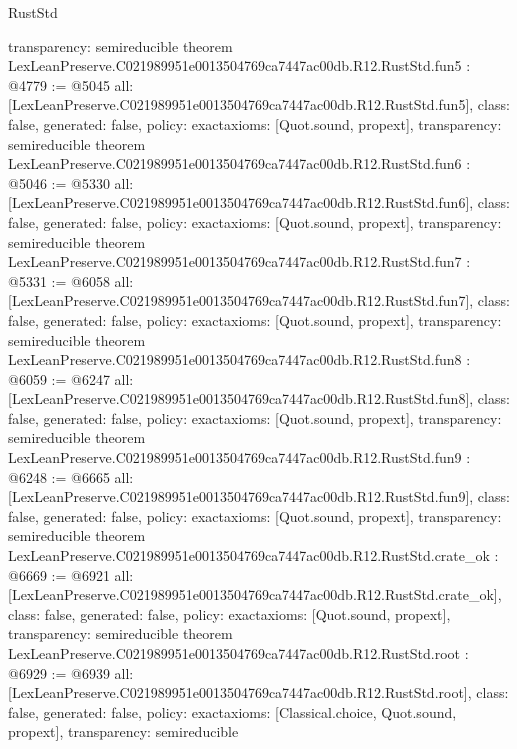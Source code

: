 \begin{lexlean}{RustStd}
\begin{coremodule}
{  transparency: semireducible
}
theorem LexLeanPreserve.C021989951e0013504769ca7447ac00db.R12.RustStd.fun5 : @4779 := @5045 {
  all: [LexLeanPreserve.C021989951e0013504769ca7447ac00db.R12.RustStd.fun5],
  class: false,
  generated: false,
  policy: exact{axioms: [Quot.sound, propext]},
  transparency: semireducible
}
theorem LexLeanPreserve.C021989951e0013504769ca7447ac00db.R12.RustStd.fun6 : @5046 := @5330 {
  all: [LexLeanPreserve.C021989951e0013504769ca7447ac00db.R12.RustStd.fun6],
  class: false,
  generated: false,
  policy: exact{axioms: [Quot.sound, propext]},
  transparency: semireducible
}
theorem LexLeanPreserve.C021989951e0013504769ca7447ac00db.R12.RustStd.fun7 : @5331 := @6058 {
  all: [LexLeanPreserve.C021989951e0013504769ca7447ac00db.R12.RustStd.fun7],
  class: false,
  generated: false,
  policy: exact{axioms: [Quot.sound, propext]},
  transparency: semireducible
}
theorem LexLeanPreserve.C021989951e0013504769ca7447ac00db.R12.RustStd.fun8 : @6059 := @6247 {
  all: [LexLeanPreserve.C021989951e0013504769ca7447ac00db.R12.RustStd.fun8],
  class: false,
  generated: false,
  policy: exact{axioms: [Quot.sound, propext]},
  transparency: semireducible
}
theorem LexLeanPreserve.C021989951e0013504769ca7447ac00db.R12.RustStd.fun9 : @6248 := @6665 {
  all: [LexLeanPreserve.C021989951e0013504769ca7447ac00db.R12.RustStd.fun9],
  class: false,
  generated: false,
  policy: exact{axioms: [Quot.sound, propext]},
  transparency: semireducible
}
theorem LexLeanPreserve.C021989951e0013504769ca7447ac00db.R12.RustStd.crate_ok : @6669 := @6921 {
  all: [LexLeanPreserve.C021989951e0013504769ca7447ac00db.R12.RustStd.crate_ok],
  class: false,
  generated: false,
  policy: exact{axioms: [Quot.sound, propext]},
  transparency: semireducible
}
theorem LexLeanPreserve.C021989951e0013504769ca7447ac00db.R12.RustStd.root : @6929 := @6939 {
  all: [LexLeanPreserve.C021989951e0013504769ca7447ac00db.R12.RustStd.root],
  class: false,
  generated: false,
  policy: exact{axioms: [Classical.choice, Quot.sound, propext]},
  transparency: semireducible
}


\end{coremodule}
\end{lexlean}
